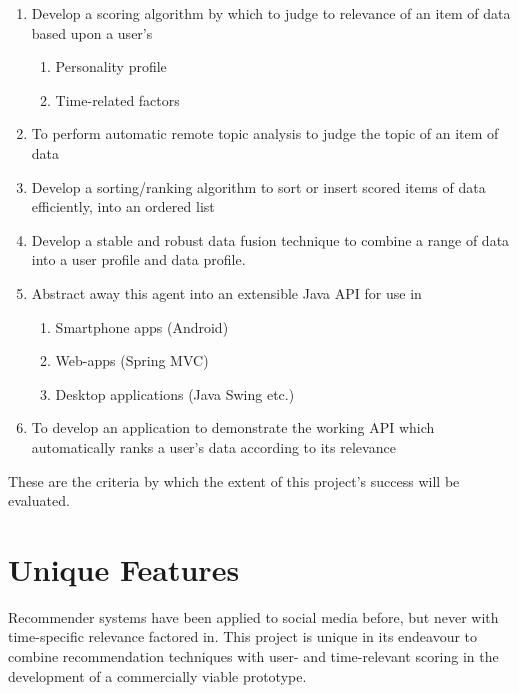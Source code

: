 \begin{enumerate}
	\item Develop a scoring algorithm by which to judge to relevance of an item of data based upon a user's
	\begin{enumerate}
		\item Personality profile
		\item Time-related factors
	\end{enumerate}
	\item To perform automatic remote topic analysis to judge the topic of an item of data
	\item Develop a sorting/ranking algorithm to sort or insert scored items of data efficiently, into an ordered list
	\item Develop a stable and robust data fusion technique to combine a range of data into a user profile and data profile.
	\item Abstract away this agent into an extensible Java API for use in
	\begin{enumerate}
		\item Smartphone apps (Android)
		\item Web-apps (Spring MVC)
		\item Desktop applications (Java Swing etc.)
	\end{enumerate}
	\item To develop an application to demonstrate the working API which automatically ranks a user's data according to its relevance
\end{enumerate}

These are the criteria by which the extent of this project's success will be evaluated.

\section{Unique Features}

Recommender systems have been applied to social media before, but never with time-specific relevance factored in. This project is unique in its endeavour to combine recommendation techniques with user- and time-relevant scoring in the development of a commercially viable prototype.